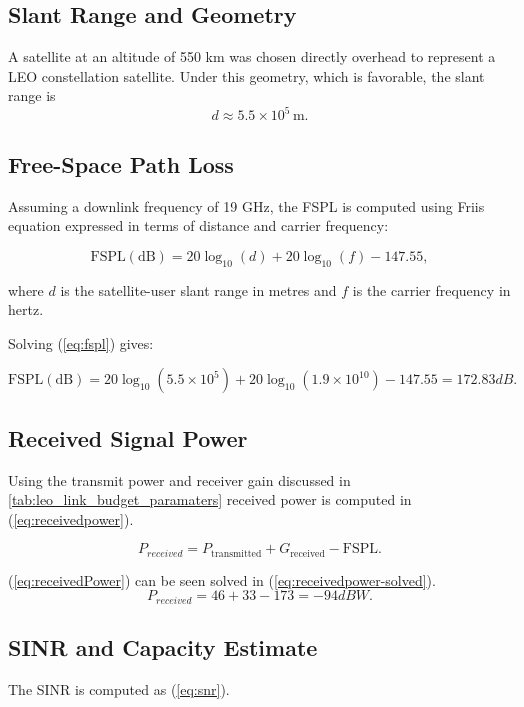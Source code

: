 \subsection{Slant Range and Geometry}
A satellite at an altitude of 550 km was chosen directly overhead to represent a LEO constellation satellite. Under this geometry, which is favorable, the slant range is 
\[
d \approx 5.5 \times 10^5 \, \mathrm{m}.
\]

\subsection{Free-Space Path Loss}
Assuming a downlink frequency of 19 GHz, the FSPL is computed using Friis equation expressed in terms of distance and carrier frequency:

\begin{equation}
\label{eq:fspl}
\mathrm{FSPL(dB)} = 20 \log_{10}(d) + 20 \log_{10}(f) - 147.55,    
\end{equation}

where \(d\) is the satellite-user slant range in metres and \(f\) is the carrier frequency in hertz.

Solving (\ref{eq:fspl}) gives:

\begin{equation}
\label{eq:fspl-solved}
\mathrm{FSPL(dB)} = 20 \log_{10}(5.5 \times 10^5) + 20 \log_{10}(1.9 \times 10^{10}) - 147.55 = 172.83 dB.    
\end{equation}

\subsection{Received Signal Power}
Using the transmit power and receiver gain discussed in \ref{tab:leo_link_budget_paramaters} received power is computed in (\ref{eq:receivedpower}).

\begin{equation}
\label{eq:receivedpower}
P_{received} = P_\mathrm{transmitted} + G_\mathrm{received} - \mathrm{FSPL}.
\end{equation}

(\ref{eq:receivedPower}) can be seen solved in (\ref{eq:receivedpower-solved}).
\begin{equation}
\label{eq:receivedpower-solved}
P_{received} = 46 + 33 - 173 = -94 dBW.
\end{equation}

\subsection{SINR and Capacity Estimate}
The SINR is computed as (\ref{eq:snr}).


